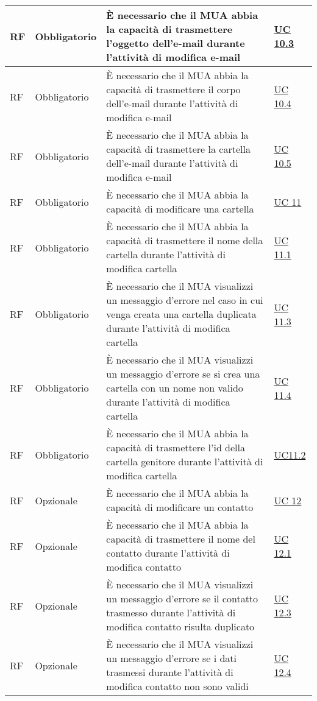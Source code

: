 \begin{longtable}{*{1}{>{\centering\arraybackslash}p{1.5cm}}*{1}{>{\centering\arraybackslash}p{2.5cm}}p{6cm}*{1}{>{\centering\arraybackslash}p{3cm}}}
    \\\hline
    RF & Obbligatorio & È necessario che il MUA abbia la capacità di trasmettere l'oggetto dell'e-mail durante l'attività di modifica e-mail & \hyperref[sec:UC10.3]{UC 10.3}
    \\\hline
    RF & Obbligatorio & È necessario che il MUA abbia la capacità di trasmettere il corpo dell'e-mail durante l'attività di modifica e-mail & \hyperref[sec:UC10.4]{UC 10.4}
    \\\hline
    RF & Obbligatorio & È necessario che il MUA abbia la capacità di trasmettere la cartella dell'e-mail durante l'attività di modifica e-mail & \hyperref[sec:UC10.5]{UC 10.5}
    \\\hline
    RF & Obbligatorio & È necessario che il MUA abbia la capacità di modificare una cartella & \hyperref[sec:UC11]{UC 11}
    \\\hline
    RF & Obbligatorio & È necessario che il MUA abbia la capacità di trasmettere il nome della cartella durante l'attività di modifica cartella & \hyperref[sec:UC11.1]{UC 11.1}
    \\\hline
    RF & Obbligatorio & È necessario che il MUA visualizzi un messaggio d'errore nel caso in cui venga creata una cartella duplicata durante l'attività di modifica cartella & \hyperref[sec:UC11.3]{UC 11.3}
    \\\hline
    RF & Obbligatorio & È necessario che il MUA visualizzi un messaggio d'errore se si crea una cartella con un nome non valido durante l'attività di modifica cartella & \hyperref[sec:UC11.4]{UC 11.4}
    \\\hline
    RF & Obbligatorio & È necessario che il MUA abbia la capacità di trasmettere l'id della cartella genitore durante l'attività di modifica cartella & \hyperref[sec:UC11.2]{UC11.2}
    \\\hline
    RF & Opzionale & È necessario che il MUA abbia la capacità di modificare un contatto & \hyperref[sec:UC12]{UC 12}
    \\\hline
    RF & Opzionale & È necessario che il MUA abbia la capacità di trasmettere il nome del contatto durante l'attività di modifica contatto & \hyperref[sec:UC12.1]{UC 12.1}
    \\\hline
    RF & Opzionale & È necessario che il MUA visualizzi un messaggio d'errore se il contatto trasmesso durante l'attività di modifica contatto risulta duplicato & \hyperref[sec:UC12.3]{UC 12.3}
    \\\hline
    RF & Opzionale & È necessario che il MUA visualizzi un messaggio d'errore se i dati trasmessi durante l'attività di modifica contatto non sono validi & \hyperref[sec:UC12.4]{UC 12.4}

\end{longtable}
